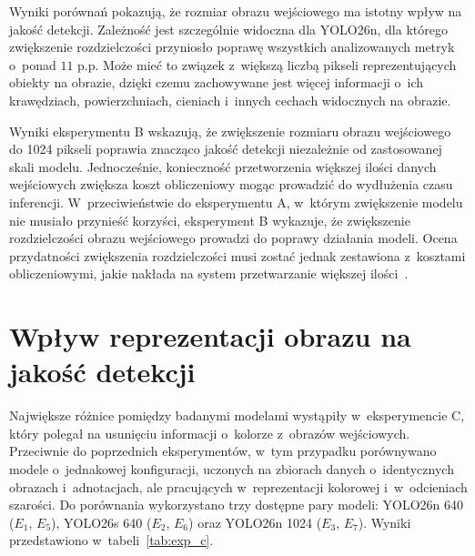 Wyniki porównań pokazują, że rozmiar obrazu wejściowego ma istotny wpływ na jakość detekcji. Zależność jest szczególnie widoczna dla YOLO26n, dla którego zwiększenie rozdzielczości przyniosło poprawę wszystkich analizowanych metryk o~ponad $11$ p.p. Może mieć to związek z~większą liczbą pikseli reprezentujących obiekty na obrazie, dzięki czemu zachowywane jest więcej informacji o~ich krawędziach, powierzchniach, cieniach i~innych cechach widocznych na obrazie.

Wyniki eksperymentu B wskazują, że zwiększenie rozmiaru obrazu wejściowego do 1024 pikseli poprawia znacząco jakość detekcji niezależnie od zastosowanej skali modelu. Jednocześnie, konieczność przetworzenia większej ilości danych wejściowych zwiększa koszt obliczeniowy mogąc prowadzić do wydłużenia czasu inferencji. W~przeciwieństwie do eksperymentu A, w~którym zwiększenie modelu nie musiało przynieść korzyści, eksperyment B wykazuje, że zwiększenie rozdzielczości obrazu wejściowego prowadzi do poprawy działania modeli. Ocena przydatności zwiększenia rozdzielczości musi zostać jednak zestawiona z~kosztami obliczeniowymi, jakie nakłada na system przetwarzanie większej ilości~.

\section{Wpływ reprezentacji obrazu na jakość detekcji}
\label{ssec:rgb_grayscale}

Największe różnice pomiędzy badanymi modelami wystąpiły w~eksperymencie C, który polegał na usunięciu informacji o~kolorze z~obrazów wejściowych. Przeciwnie do poprzednich eksperymentów, w~tym przypadku porównywano modele o~jednakowej konfiguracji, uczonych na zbiorach danych o~identycznych obrazach i~adnotacjach, ale pracujących w~reprezentacji kolorowej i~w~odcieniach szarości. Do porównania wykorzystano trzy dostępne pary modeli: YOLO26n 640 ($E_1$, $E_5$), YOLO26s 640 ($E_2$, $E_6$) oraz YOLO26n 1024 ($E_3$, $E_7$). Wyniki przedstawiono w~tabeli~\ref{tab:exp_c}.

